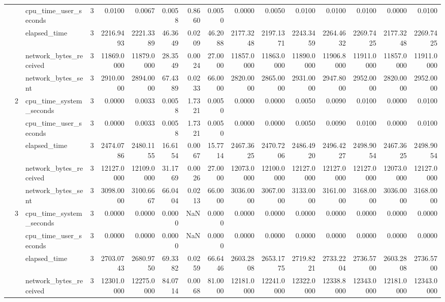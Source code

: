 \begin{tabular}{lllrrrrrrrrrrrrr}
 &  & cpu\_time\_user\_seconds & 3 & 0.0100 & 0.0067 & 0.0058 & 0.8660 & 0.0050 & 0.0000 & 0.0050 & 0.0100 & 0.0100 & 0.0100 & 0.0000 & 0.0100 \\
 &  & elapsed\_time & 3 & 2216.9493 & 2221.3389 & 46.3649 & 0.0209 & 46.2088 & 2177.3248 & 2197.1371 & 2243.3459 & 2264.4632 & 2269.7425 & 2177.3248 & 2269.7425 \\
 &  & network\_bytes\_received & 3 & 11869.0000 & 11879.0000 & 28.3549 & 0.0024 & 27.0000 & 11857.0000 & 11863.0000 & 11890.0000 & 11906.8000 & 11911.0000 & 11857.0000 & 11911.0000 \\
 &  & network\_bytes\_sent & 3 & 2910.0000 & 2894.0000 & 67.4389 & 0.0233 & 66.0000 & 2820.0000 & 2865.0000 & 2931.0000 & 2947.8000 & 2952.0000 & 2820.0000 & 2952.0000 \\
\cline{2-16}
 & \multirow[t]{5}{*}{2} & cpu\_time\_system\_seconds & 3 & 0.0000 & 0.0033 & 0.0058 & 1.7321 & 0.0050 & 0.0000 & 0.0000 & 0.0050 & 0.0090 & 0.0100 & 0.0000 & 0.0100 \\
 &  & cpu\_time\_user\_seconds & 3 & 0.0000 & 0.0033 & 0.0058 & 1.7321 & 0.0050 & 0.0000 & 0.0000 & 0.0050 & 0.0090 & 0.0100 & 0.0000 & 0.0100 \\
 &  & elapsed\_time & 3 & 2474.0786 & 2480.1155 & 16.6154 & 0.0067 & 15.7714 & 2467.3625 & 2470.7206 & 2486.4920 & 2496.4227 & 2498.9054 & 2467.3625 & 2498.9054 \\
 &  & network\_bytes\_received & 3 & 12127.0000 & 12109.0000 & 31.1769 & 0.0026 & 27.0000 & 12073.0000 & 12100.0000 & 12127.0000 & 12127.0000 & 12127.0000 & 12073.0000 & 12127.0000 \\
 &  & network\_bytes\_sent & 3 & 3098.0000 & 3100.6667 & 66.0404 & 0.0213 & 66.0000 & 3036.0000 & 3067.0000 & 3133.0000 & 3161.0000 & 3168.0000 & 3036.0000 & 3168.0000 \\
\cline{2-16}
 & \multirow[t]{5}{*}{3} & cpu\_time\_system\_seconds & 3 & 0.0000 & 0.0000 & 0.0000 & NaN & 0.0000 & 0.0000 & 0.0000 & 0.0000 & 0.0000 & 0.0000 & 0.0000 & 0.0000 \\
 &  & cpu\_time\_user\_seconds & 3 & 0.0000 & 0.0000 & 0.0000 & NaN & 0.0000 & 0.0000 & 0.0000 & 0.0000 & 0.0000 & 0.0000 & 0.0000 & 0.0000 \\
 &  & elapsed\_time & 3 & 2703.0743 & 2680.9750 & 69.3382 & 0.0259 & 66.6446 & 2603.2808 & 2653.1775 & 2719.8221 & 2733.2204 & 2736.5700 & 2603.2808 & 2736.5700 \\
 &  & network\_bytes\_received & 3 & 12301.0000 & 12275.0000 & 84.0714 & 0.0068 & 81.0000 & 12181.0000 & 12241.0000 & 12322.0000 & 12338.8000 & 12343.0000 & 12181.0000 & 12343.0000 \\

\end{tabular}
